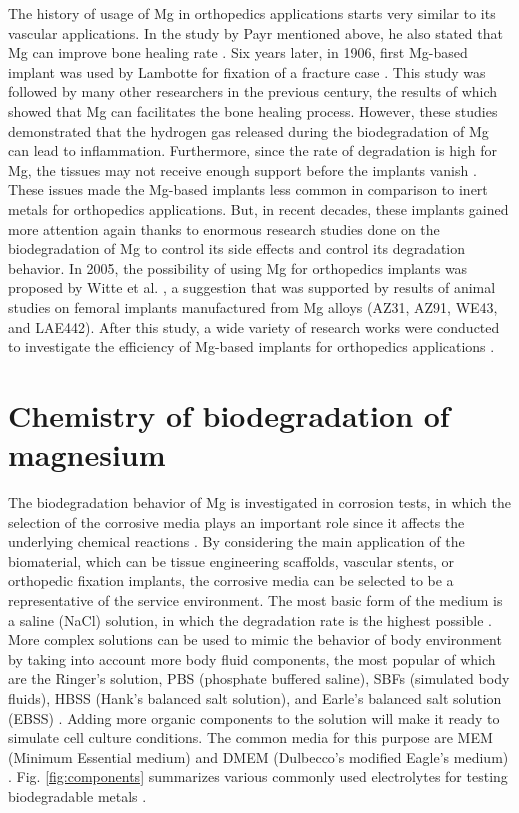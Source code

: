 The history of usage of Mg in orthopedics applications starts very similar to its vascular applications. In the study by Payr mentioned above, he also stated that Mg can improve bone healing rate \cite{Witte2010}. Six years later, in 1906, first Mg-based implant was used by Lambotte for fixation of a fracture case \cite{lambotte1909technique,lambotte1932utilisation}. This study was followed by many other researchers in the previous century, the results of which showed that Mg can facilitates the bone healing process. However, these studies demonstrated that the hydrogen gas released during the biodegradation of Mg can lead to inflammation. Furthermore, since the rate of degradation is high for Mg, the tissues may not receive enough support before the implants vanish \cite{Witte2010}. These issues made the Mg-based implants less common in comparison to inert metals for orthopedics applications. But, in recent decades, these implants gained more attention again thanks to enormous research studies done on the biodegradation of Mg to control its side effects and control its degradation behavior. In 2005, the possibility of using Mg for orthopedics implants was proposed by Witte et al. \cite{Witte2005}, a suggestion that was supported by results of animal studies on femoral implants manufactured from Mg alloys (AZ31, AZ91, WE43, and LAE442). After this study, a wide variety of research works were conducted to investigate the efficiency of Mg-based implants for orthopedics applications \cite{Wang2020,Huang2020,Zhao2017}.


\section{Chemistry of biodegradation of magnesium}


The biodegradation behavior of Mg is investigated in corrosion tests, in which the selection of the corrosive media plays an important role since it affects the underlying chemical reactions \cite{Mei2020}. By considering the main application of the biomaterial, which can be tissue engineering scaffolds, vascular stents, or orthopedic fixation implants, the corrosive media can be selected to be a representative of the service environment. The most basic form of the medium is a saline (NaCl) solution, in which the degradation rate is the highest possible \cite{Mei2020}. More complex solutions can be used to mimic the behavior of body environment by taking into account more body fluid components, the most popular of which are the Ringer's solution, PBS (phosphate buffered saline), SBFs (simulated body fluids), HBSS (Hank's balanced salt solution), and Earle's balanced salt solution (EBSS) \cite{Mei2020}. Adding more organic components to the solution will make it ready to simulate cell culture conditions. The common media for this purpose are MEM (Minimum Essential medium) and DMEM (Dulbecco's modified Eagle's medium) \cite{Mei2020}. Fig. \ref{fig:components} summarizes various commonly used electrolytes for testing biodegradable metals \cite{Mei2020}.


